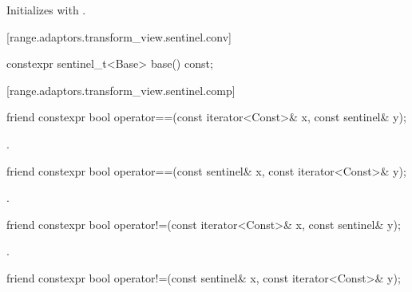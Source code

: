 \begin{itemdescr}
\pnum
\effects Initializes  with .
\end{itemdescr}

[range.adaptors.transform_view.sentinel.conv]{}

\begin{itemdecl}
constexpr sentinel_t<Base> base() const;
\end{itemdecl}

\begin{itemdescr}
\pnum
\oldtxt{\returns}  
\end{itemdescr}

[range.adaptors.transform_view.sentinel.comp]{}

\begin{itemdecl}
friend constexpr bool operator==(const iterator<Const>& x, const sentinel& y);
\end{itemdecl}

\begin{itemdescr}
\pnum
\returns {}.
\end{itemdescr}

\begin{itemdecl}
friend constexpr bool operator==(const sentinel& x, const iterator<Const>& y);
\end{itemdecl}

\begin{itemdescr}
\pnum
\returns {}.
\end{itemdescr}

%
\begin{itemdecl}
friend constexpr bool operator!=(const iterator<Const>& x, const sentinel& y);
\end{itemdecl}

\begin{itemdescr}
\pnum
\returns {}.
\end{itemdescr}

%
\begin{itemdecl}
friend constexpr bool operator!=(const sentinel& x, const iterator<Const>& y);
\end{itemdecl}

